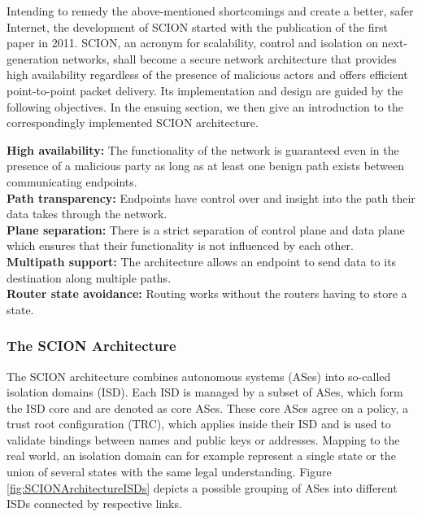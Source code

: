 Intending to remedy the above-mentioned shortcomings and create a better, safer Internet, the development of SCION started with the publication of the first paper \cite{SCIONPaper} in 2011. SCION, an acronym for scalability, control and isolation on next-generation networks, shall become a secure network architecture that provides high availability regardless of the presence of malicious actors and offers efficient point-to-point packet delivery. Its implementation and design are guided by the following objectives. In the ensuing section, we then give an introduction to the correspondingly implemented SCION architecture.

{\small \textbf{High availability:} The functionality of the network is guaranteed even in the presence of a malicious party as long as at least one benign path exists between communicating endpoints. \smallskip\\
	\textbf{Path transparency:} Endpoints have control over and insight into the path their data takes through the network. \smallskip\\
	\textbf{Plane separation:} There is a strict separation of control plane and data plane which ensures that their functionality is not influenced by each other. \smallskip\\
	\textbf{Multipath support:} The architecture allows an endpoint to send data to its destination along multiple paths. \smallskip\\
	\textbf{Router state avoidance:} Routing works without the routers having to store a state.
}

\subsubsection{The SCION Architecture}

The SCION architecture combines autonomous systems (ASes) into so-called isolation domains (ISD). Each ISD is managed by a subset of ASes, which form the ISD core and are denoted as core ASes. These core ASes agree on a policy, a trust root configuration (TRC), which applies inside their ISD and is used to validate bindings between names and public keys or addresses. Mapping to the real world, an isolation domain can for example represent a single state or the union of several states with the same legal understanding. Figure \ref{fig:SCIONArchitectureISDs} depicts a possible grouping of ASes into different ISDs connected by respective links.


